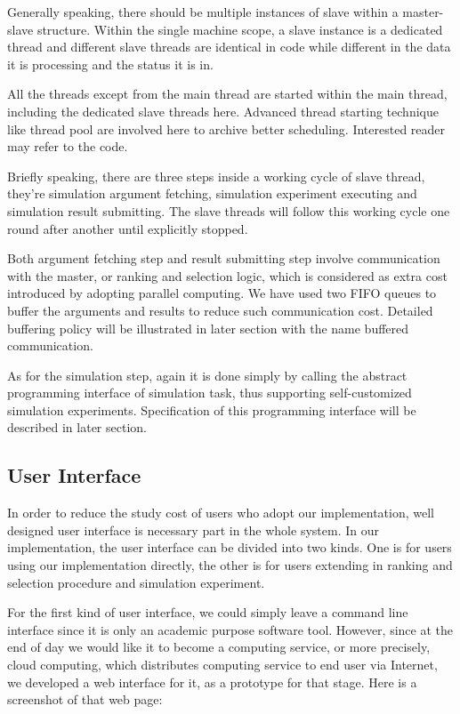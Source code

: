 \documentclass[12pt,a4paper]{report}
\begin{document}
Generally speaking, there should be multiple instances of slave within a master-slave structure. Within the single machine scope, a slave instance is a dedicated thread and different slave threads are identical in code while different in the data it is processing and the status it is in.

All the threads except from the main thread are started within the main thread, including the dedicated slave threads here. Advanced thread starting technique like thread pool are involved here to archive better scheduling. Interested reader may refer to the code.

Briefly speaking, there are three steps inside a working cycle of slave thread, they're simulation argument fetching, simulation experiment executing and simulation result submitting. The slave threads will follow this working cycle one round after another until explicitly stopped.

Both argument fetching step and result submitting step involve communication with the master, or ranking and selection logic, which is considered as extra cost introduced by adopting parallel computing. We have used two FIFO queues to buffer the arguments and results to reduce such communication cost. Detailed buffering policy will be illustrated in later section with the name buffered communication.

As for the simulation step, again it is done simply by calling the abstract programming interface of simulation task, thus supporting self-customized simulation experiments. Specification of this programming interface will be described in later section.

\subsection{User Interface}

In order to reduce the study cost of users who adopt our implementation, well designed user interface is necessary part in the whole system. In our implementation, the user interface can be divided into two kinds. One is for users using our implementation directly, the other is for users extending in ranking and selection procedure and simulation experiment.

For the first kind of user interface, we could simply leave a command line interface since it is only an academic purpose software tool. However, since at the end of day we would like it to become a computing service, or more precisely, cloud computing, which distributes computing service to end user via Internet, we developed a web interface for it, as a prototype for that stage. Here is a screenshot of that web page:
\end{document}
